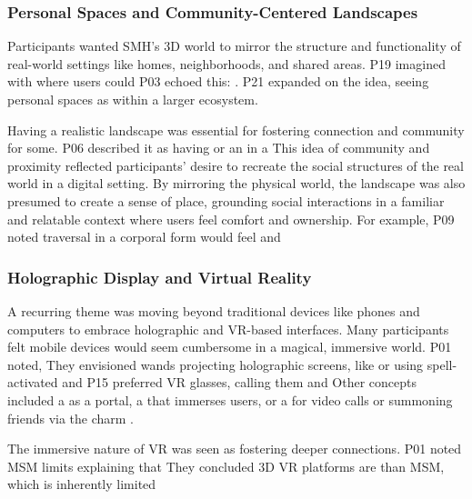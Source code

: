 \subsubsection{Personal Spaces and Community-Centered Landscapes}
\label{lab:4-1-2}
Participants wanted SMH's 3D world to mirror the structure and functionality of real-world settings like homes, neighborhoods, and shared areas. P19 imagined  with  where users could  
P03 echoed this: . P21 expanded on the idea, seeing personal spaces as  within a larger ecosystem.

Having a realistic landscape was essential for fostering connection and community for some. P06 described it as having  or an  in a  This idea of community and proximity reflected participants' desire to recreate the social structures of the real world in a digital setting. By mirroring the physical world, the landscape was also presumed to create a sense of place, grounding social interactions in a familiar and relatable context where users feel comfort and ownership. For example, P09 noted traversal in a corporal form would feel   and 


\subsubsection{Holographic Display and Virtual Reality}
\label{lab:4-1-3}
A recurring theme was moving beyond traditional devices like phones and computers to embrace holographic and VR-based interfaces. Many participants felt mobile devices would seem cumbersome in a magical, immersive world. P01 noted,  They envisioned wands projecting holographic screens, like  or using spell-activated  and  P15 preferred VR glasses, calling them   and  Other concepts included a  as a portal, a  that immerses users, or a  for video calls or summoning friends via the charm .

The immersive nature of VR was seen as fostering deeper connections. P01 noted MSM limits  explaining that They concluded 3D VR platforms are  than MSM, which is inherently limited 
